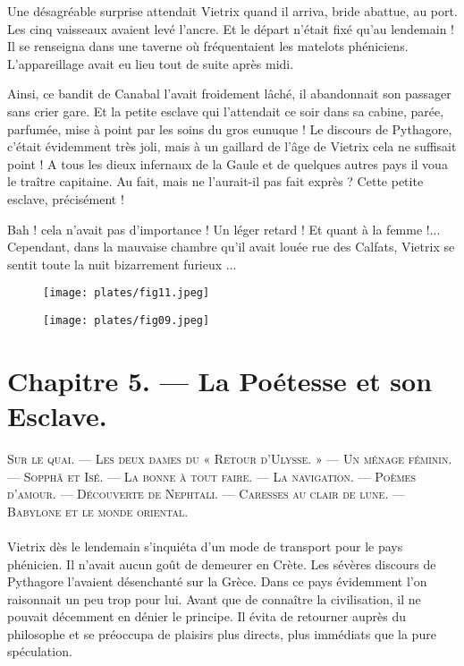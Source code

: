 \documentclass[a4paper, 11pt, oneside, polutonikogreek, french]{article}
\begin{document}
\bigskip
\centerline{\EightStarTaper}
\centerline{\EightStarTaper\EightStarTaper}
\bigskip

Une désagréable surprise attendait Vietrix quand il arriva, bride abattue, au port. Les cinq vaisseaux avaient levé l'ancre. Et le départ n'était fixé qu'au lendemain ! Il se renseigna dans une taverne où fréquentaient les matelots phéniciens. L'appareillage avait eu lieu tout de suite après midi.

Ainsi, ce bandit de Canabal l'avait froidement lâché, il abandonnait son passager sans crier gare. Et la petite esclave qui l'attendait ce soir dans sa cabine, parée, parfumée, mise à point par les soins du gros eunuque ! Le discours de Pythagore, c'était évidemment très joli, mais à un gaillard de l'âge de Vietrix cela ne suffisait point ! A tous les dieux infernaux de la Gaule et de quelques autres pays il voua le traître capitaine. Au fait, mais ne l'aurait-il pas fait exprès ? Cette petite esclave, précisément !

Bah ! cela n'avait pas d'importance ! Un léger retard ! Et quant à la femme !... Cependant, dans la mauvaise chambre qu'il avait louée rue des Calfats, Vietrix se sentit toute la nuit bizarrement furieux ...

\begin{figure}[H]
\centering
\texttt{[image: plates/fig11.jpeg]}
\end{figure}
\clearpage
\begin{figure}[H]
\centering
\texttt{[image: plates/fig09.jpeg]}
\end{figure}
\section{Chapitre 5. --- La Poétesse et son Esclave.}
\begin{center}
\scshape
\small
Sur le quai. --- Les deux dames du « Retour d'Ulysse. » --- Un ménage féminin. --- Sopphâ et Isé. --- La bonne à tout faire. --- La navigation. --- Poèmes d'amour. --- Découverte de Nephtali. --- Caresses au clair de lune. --- Babylone et le monde oriental.
\end{center}
\paragraph{}
Vietrix dès le lendemain s'inquiéta d'un mode de transport pour le pays phénicien. Il n'avait aucun goût de demeurer en Crète. Les sévères discours de Pythagore l'avaient désenchanté sur la Grèce. Dans ce pays évidemment l'on raisonnait un peu trop pour lui. Avant que de connaître la civilisation, il ne pouvait décemment en dénier le principe. Il évita de retourner auprès du philosophe et se préoccupa de plaisirs plus directs, plus immédiats que la pure spéculation.
\end{document}

